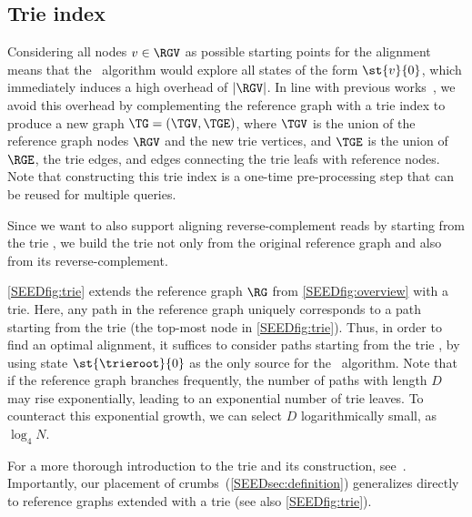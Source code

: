 

\subsection{Trie index} \label{SEEDsec:trie}
%
Considering all nodes $v \in \RGV$ as possible starting points for the alignment
means that the \A~algorithm would explore all states of the form $\st{v}{0}$,
which immediately induces a high overhead of $\lvert \RGV \rvert$.
%
In line with previous works~\citep{ivanov2020astarix,dox2018efficient}, we avoid
this overhead by complementing the reference graph with a trie index to produce
a new graph $\TG = (\TGV, \TGE)$, where $\TGV$ is the union of the reference
graph nodes $\RGV$ and the new trie vertices, and $\TGE$ is the union of $\RGE$,
the trie edges, and edges connecting the trie leafs with reference nodes. Note
that constructing this trie index is a one-time pre-processing step that can be
reused for multiple queries.

Since we want to also support aligning reverse-complement reads by starting from
the trie \trieroot{}, we build the trie not only from the original reference
graph and also from its reverse-complement.

%
\cref{SEEDfig:trie} extends the reference graph $\RG$ from \cref{SEEDfig:overview} with
a trie. Here, any path in the reference graph uniquely corresponds to a path
starting from the trie \trieroot{} (the top-most node in \cref{SEEDfig:trie}). Thus,
in order to find an optimal alignment, it suffices to consider paths starting
from the trie \trieroot{}, by using state $\st{\trieroot}{0}$ as the only source
for the \A~algorithm.
%
Note that if the reference graph branches frequently, the number of paths with
length $D$ may rise exponentially, leading to an exponential number of trie
leaves. To counteract this exponential growth, we can select $D$ logarithmically
small, as $\log_4N$.

For a more thorough introduction to the trie and its construction,
see~\citep{ivanov2020astarix}. Importantly, our placement of
crumbs~(\cref{SEEDsec:definition}) generalizes directly to reference graphs extended
with a trie (see also \cref{SEEDfig:trie}).


